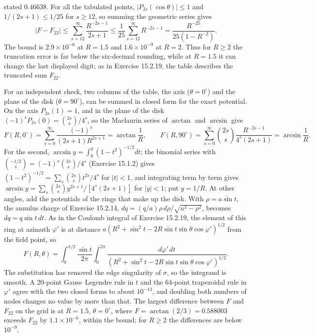 stated $0.46638$.
For all the tabulated points, $|P_{2s}(\cos\theta)|\le1$ and
$1/(2s+1)\le1/25$ for $s\ge12$, so summing the geometric series gives
\[
|F-F_{22}|\le\sum_{s=12}^\infty\frac{R^{-2s-1}}{2s+1}
\le\frac1{25}\sum_{s=12}^\infty R^{-2s-1}
=\frac{R^{-25}}{25(1-R^{-2})}.
\]
The bound is $2.9\times10^{-6}$ at $R=1.5$ and $1.6\times10^{-9}$ at
$R=2$. Thus for $R\ge2$ the truncation error is far below the
six-decimal rounding, while at $R=1.5$ it can change the last displayed
digit; as in Exercise 15.2.19, the table describes the truncated sum
$F_{22}$.

For an independent check, two columns of the table, the axis
($\theta=0^\circ$) and the plane of the disk ($\theta=90^\circ$), can be
summed in closed form for the exact potential. On the axis
$P_{2s}(1)=1$, and in the plane of the disk
$(-1)^sP_{2s}(0)=\binom{2s}{s}/4^s$, so the Maclaurin series of
$\arctan$ and $\arcsin$ give
\[
F(R,0^\circ)=\sum_{s=0}^\infty\frac{(-1)^s}{(2s+1)R^{2s+1}}
=\arctan\frac1R,\qquad
F(R,90^\circ)=\sum_{s=0}^\infty\binom{2s}{s}\frac{R^{-2s-1}}{4^s(2s+1)}
=\arcsin\frac1R.
\]
For the second, $\arcsin y=\int_0^y(1-t^2)^{-1/2}dt$; the binomial
series with $\binom{-1/2}{s}=(-1)^s\binom{2s}{s}/4^s$
(Exercise 15.1.2) gives $(1-t^2)^{-1/2}=\sum_s\binom{2s}{s}t^{2s}/4^s$
for $|t|<1$, and integrating term by term gives
$\arcsin y=\sum_s\binom{2s}{s}y^{2s+1}/[4^s(2s+1)]$ for $|y|<1$; put
$y=1/R$.
At other angles, add the potentials of the rings that make up the disk.
With $\rho=a\sin t$, the annulus charge of Exercise 15.2.14,
$dq=(q/a)\rho\,d\rho/\sqrt{a^2-\rho^2}$, becomes $dq=q\sin t\,dt$. As
in the Coulomb integral of Exercise 15.2.19, the element of this ring
at azimuth $\varphi'$ is at distance
$a(R^2+\sin^2t-2R\sin t\sin\theta\cos\varphi')^{1/2}$ from the field
point, so
\[
F(R,\theta)=\int_0^{\pi/2}\frac{\sin t}{2\pi}\int_0^{2\pi}
\frac{d\varphi'\,dt}{(R^2+\sin^2t-2R\sin t\sin\theta\cos\varphi')^{1/2}}.
\]
The substitution has removed the edge singularity of $\sigma$, so the
integrand is smooth. A 20-point Gauss--Legendre rule in $t$ and the
64-point trapezoidal rule in $\varphi'$ agree with the two closed forms
to about $10^{-13}$, and doubling both numbers of nodes changes no value
by more than that. The largest difference between $F$ and $F_{22}$ on
the grid is at $R=1.5$, $\theta=0^\circ$, where
$F=\arctan(2/3)=0.588003$ exceeds $F_{22}$ by $1.1\times10^{-6}$,
within the bound; for $R\ge2$ the differences are below $10^{-9}$.

